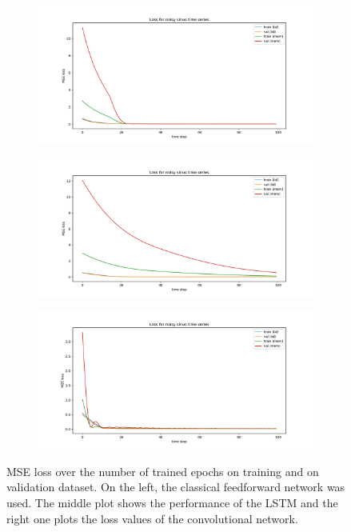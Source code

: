 \documentclass{article}
\begin{document}
\begin{figure}
  \center
  \begin{subfigure}{.35\textwidth}
    \centering
    \includegraphics[width=\linewidth]{figures/plot_twolayer_losscompare.pdf}
  \end{subfigure} 
  \hspace{-6mm}
  \begin{subfigure}{.35\textwidth}
    \centering
    \includegraphics[width=\linewidth]{figures/plot_lstm_losscompare.pdf}
  \end{subfigure} 
  \hspace{-6mm}
  \begin{subfigure}{.35\textwidth}
    \centering
    \includegraphics[width=\linewidth]{figures/plot_cnn_losscompare.pdf}
  \end{subfigure}
  \caption{MSE loss over the number of trained epochs on training and on 
  validation dataset. On the left, the classical feedforward network was used.
  The middle plot shows the performance of the LSTM and the right one plots the
  loss values of the convolutional network.}
  \label{fig:noise_loss_impact}
\end{figure}
\end{document}
